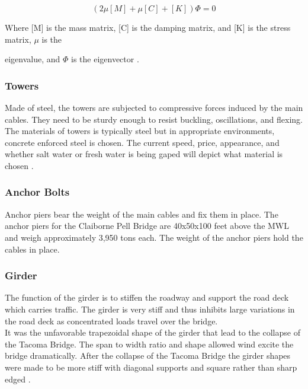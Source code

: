 
\begin{equation}

( 2 \mu[M] + \mu[C] + [K]){\Phi} = 0

\label{eqn:Euler}

\end{equation}

Where [M] is the mass matrix, [C] is the damping matrix, and [K] is the stress matrix, $\mu$ is the 

eigenvalue, and $\Phi$ is the eigenvector \cite{manoj}. 

\subsubsection{Towers}

Made of steel, the towers are subjected to compressive forces induced by the main cables. They need to be sturdy enough to resist buckling, oscillations,
and flexing. The materials of towers is typically steel but in appropriate environments, concrete enforced steel is chosen. The current speed, price,
appearance, and whether salt water or fresh water is being gaped will depict what material is chosen \cite{manoj}. 


\subsubsection{Anchor Bolts}

Anchor piers bear the weight of the main cables and fix them in place. The anchor piers for the Claiborne Pell Bridge are 40x50x100 feet above the MWL and
weigh approximately 3,950 tons each. The weight of the anchor piers hold the cables in place. 

\subsubsection{Girder}

The function of the girder is to stiffen the roadway and support the road deck which carries traffic. The girder is very stiff and thus inhibits large
variations in the road deck as concentrated loads travel over the bridge.\\ 
\indent It was the unfavorable trapezoidal shape of the girder that lead to the collapse of the Tacoma Bridge. The span to width ratio and shape allowed
wind excite the bridge dramatically. After the collapse of the Tacoma Bridge the girder shapes were made to be more stiff with diagonal supports and
square rather than sharp edged \cite{}. 

